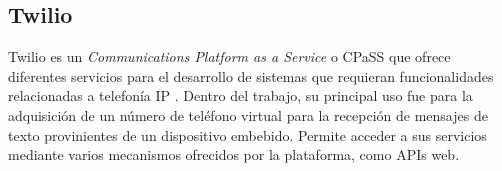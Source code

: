 \subsection{Twilio}

Twilio es un \textit{Communications Platform as a Service} o CPaSS que ofrece diferentes servicios para el desarrollo de sistemas que requieran funcionalidades relacionadas a telefonía IP \citep{TWILIO:1}. Dentro del trabajo, su principal uso fue para la adquisición de un número de teléfono virtual para la recepción de mensajes de texto provinientes de un dispositivo embebido. Permite acceder a sus servicios mediante varios mecanismos ofrecidos por la plataforma, como APIs web.
